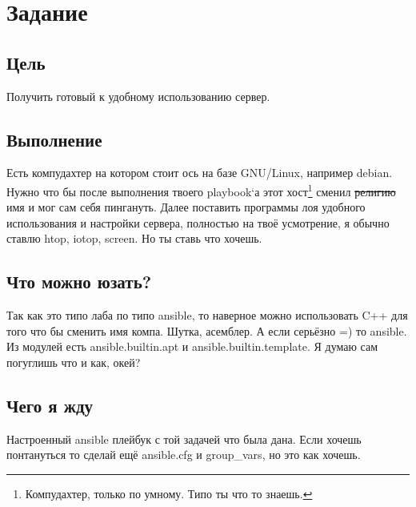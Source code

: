     \section{Задание}
        \subsection{Цель}
            Получить готовый к удобному использованию сервер.

        \subsection{Выполнение}
            Есть компудахтер на котором стоит ось на базе GNU/Linux, например debian. Нужно что бы после выполнения твоего playbook`а этот хост\footnote{Компудахтер, только по умному. Типо ты что то знаешь.} сменил \sout{религию} имя и мог сам себя пингануть. Далее поставить программы лоя удобного использования и настройки сервера, полностью на твоё усмотрение, я обычно ставлю htop, iotop, screen. Но ты ставь что хочешь.

        \pagebreak[4]\subsection{Что можно юзать?}
            Так как это типо лаба по типо ansible, то наверное можно использовать C++ для того что бы сменить имя компа. Шутка, асемблер. А если серьёзно =) то ansible. Из модулей есть ansible.builtin.apt и ansible.builtin.template. Я думаю сам погуглишь что и как, окей?

        \subsection{Чего я жду}
            Настроенный ansible плейбук с той задачей что была дана. Если хочешь понтануться то сделай ещё ansible.cfg и group\_vars, но это как хочешь.

